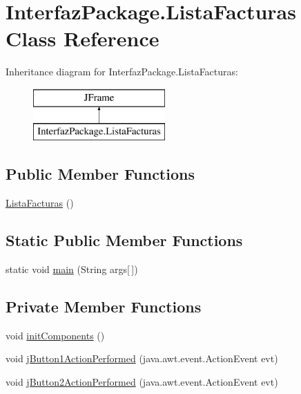 \hypertarget{class_interfaz_package_1_1_lista_facturas}{}\section{Interfaz\+Package.\+Lista\+Facturas Class Reference}
\label{class_interfaz_package_1_1_lista_facturas}
Inheritance diagram for Interfaz\+Package.\+Lista\+Facturas\+:\begin{figure}[H]
\begin{center}
\leavevmode
\includegraphics[height=2.000000cm]{class_interfaz_package_1_1_lista_facturas}
\end{center}
\end{figure}
\subsection*{Public Member Functions}
\begin{DoxyCompactItemize}
\item 
\mbox{\hyperlink{class_interfaz_package_1_1_lista_facturas_a1e539cb0cbfd907b97944bdc34987938}{Lista\+Facturas}} ()
\end{DoxyCompactItemize}
\subsection*{Static Public Member Functions}
\begin{DoxyCompactItemize}
\item 
static void \mbox{\hyperlink{class_interfaz_package_1_1_lista_facturas_aeaed8570a89909e2d33828c6d53fbe9e}{main}} (String args\mbox{[}$\,$\mbox{]})
\end{DoxyCompactItemize}
\subsection*{Private Member Functions}
\begin{DoxyCompactItemize}
\item 
void \mbox{\hyperlink{class_interfaz_package_1_1_lista_facturas_a35ba1cdc1b8458715eec0de270b35e21}{init\+Components}} ()
\item 
void \mbox{\hyperlink{class_interfaz_package_1_1_lista_facturas_ae41b741de1678a6ab365994321b47a87}{j\+Button1\+Action\+Performed}} (java.\+awt.\+event.\+Action\+Event evt)
\item 
void \mbox{\hyperlink{class_interfaz_package_1_1_lista_facturas_a1393fa71e900a876db02c2f07f33f237}{j\+Button2\+Action\+Performed}} (java.\+awt.\+event.\+Action\+Event evt)
\end{DoxyCompactItemize}
